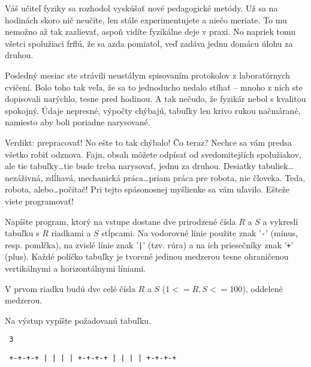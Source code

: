 




Váš učiteľ fyziky sa rozhodol vyskúšať nové pedagogické metódy. Už sa na
hodinách skoro nič neučíte, len stále experimentujete a niečo meriate. To mu
nemožno až tak zazlievať, aspoň vidíte fyzikálne deje v praxi. No napriek tomu
všetci spolužiaci frflú, že sa azda pomiatol, veď zadáva jednu domácu úlohu za
druhou.

Posledný mesiac ste strávili neustálym spisovaním protokolov z laboratórnych
cvičení. Bolo toho tak veľa, že sa to jednoducho nedalo stíhať -- mnoho z nich
ste dopisovali narýchlo, tesne pred hodinou. A tak nečudo, že fyzikár nebol s
kvalitou spokojný. Údaje nepresné, výpočty chýbajú, tabuľky len krivo rukou
načmárané, namiesto aby boli poriadne narysované.

Verdikt: prepracovať! No ešte to tak chýbalo! Čo teraz? Nechce sa vám predsa
všetko robiť odznova. Fajn, obsah môžete odpísať od svedomitejších spolužiakov,
ale tie tabuľky\dots tie bude treba narysovať, jednu za druhou. Desiatky
tabuliek\dots nezáživná, zdĺhavá, mechanická práca\dots priam práca pre robota,
nie človeka.  Teda, robota, alebo\dots počítač! Pri tejto spásonosnej myšlienke
sa vám uľavilo.  Ešteže viete programovať!

\uloha
Napíšte program, ktorý na vstupe dostane dve prirodzené čísla $R$ a $S$ a
vykreslí tabuľku s $R$ riadkami a $S$ stĺpcami. Na vodorovné línie použite znak
'{\tt -}' (mínus, resp. pomlčka), na zvislé línie znak '{\tt |}' (tzv. rúra) a
na ich priesečníky znak '{\tt +}' (plus). Každé políčko tabuľky je tvorené
jedinou medzerou tesne ohraničenou vertikálnymi a horizontálnymi líniami.


V prvom riadku budú dve celé čísla $R$ a $S$ ($1 <= R, S <= 100$), oddelené 
medzerou.



Na výstup vypíšte požadovanú tabuľku.

\priklad
\vstup\tt{} 3

\vystup\tt\obeylines
+-+-+-+
| | | |
+-+-+-+
| | | |
+-+-+-+

\koniec


